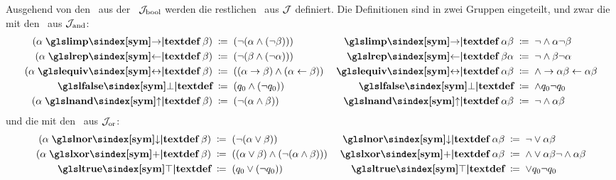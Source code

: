 Ausgehend von den \Junktoren\ aus der \BoolschenSignatur\ $\mathcal{J}_{\mathrm{bool}}$ werden die restlichen \Junktoren\ aus $\mathcal{J}$ definiert.
Die Definitionen sind in zwei Gruppen eingeteilt, und zwar die mit den \Junktoren\ aus $\mathcal{J}_{\mathrm{and}}$:
\begin{align}
	(\alpha \opdefinition{\symlimp} \beta) &\;\defeq\; (\lnot (\alpha \land  (\lnot \beta))) &
	\opdefinition{\symlimp} \alpha \beta   &\;\defeq\;  \lnot    \land \alpha \lnot \beta
	\label{def:imp}
	\\
	(\alpha \opdefinition{\symlrep} \beta) &\;\defeq\; (\lnot (\beta \land  (\lnot \alpha))) &
	\opdefinition{\symlrep} \beta  \alpha  &\;\defeq\;  \lnot    \land \beta \lnot \alpha
	\label{def:rep}
	\\
	(\alpha \opdefinition{\symlequiv} \beta) &\;\defeq\; ((\alpha \limp \beta) \land (\alpha \lrep \beta)) &
	\opdefinition{\symlequiv} \alpha  \beta  &\;\defeq\; \land \limp \alpha \beta \lrep \alpha \beta
	\label{def:equiv}
	\\
	\definition{\symlfalse}              &\;\defeq\; (\alvar_0 \land (\lnot \alvar_0)) &
	\definition{\symlfalse}              &\;\defeq\;  \land \alvar_0  \lnot \alvar_0   \label{def:false}
	\\
	(\alpha \opdefinition{\symlnand} \beta)&\;\defeq\; (\lnot (\alpha \land \beta )) &
	\opdefinition{\symlnand} \alpha  \beta &\;\defeq\;  \lnot  \land \alpha \beta \label{def:nand}
\end{align}
und die mit den \Junktoren\ aus $\mathcal{J}_{\mathrm{or}}$:
\begin{align}
	(\alpha \opdefinition{\symlnor} \beta) & \;\defeq\; (\lnot (\alpha \lor \beta))   &
	\opdefinition{\symlnor} \alpha  \beta  & \;\defeq\;  \lnot  \lor \alpha \beta \label{def:nor}
	\\
	(\alpha \opdefinition{\symlxor} \beta) & \;\defeq\; ((\alpha \lor \beta) \land (\lnot (\alpha \land \beta)))&
	\opdefinition{\symlxor} \alpha  \beta  & \;\defeq\;  \land \lor\alpha\beta \lnot \land \alpha \beta
	\label{def:add}
	\\
	\definition{\symltrue} & \;\defeq\; (\alvar_0 \lor (\lnot \alvar_0)) &
	\definition{\symltrue} & \;\defeq\;  \lor \alvar_0  \lnot \alvar_0
	\label{def:true}
\end{align}


